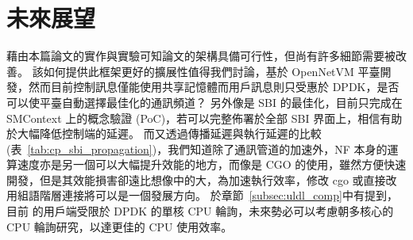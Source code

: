 \chapter{未來展望}
\label{chapter:future}

藉由本篇論文的實作與實驗可知論文的架構具備可行性，但尚有許多細節需要被改善。
該如何提供此框架更好的擴展性值得我們討論，\LHCN 基於 OpenNetVM 平臺開發，然而目前控制訊息僅能使用共享記憶體而用戶訊息則只受惠於 DPDK，是否可以使平臺自動選擇最佳化的通訊頻道？
另外像是 SBI 的最佳化，目前只完成在 SMContext 上的概念驗證 (PoC)，若可以完整佈署於全部 SBI 界面上，相信有助於大幅降低控制端的延遲。
而又透過傳播延遲與執行延遲的比較 (表~\ref{tab:cp_sbi_propagation})，我們知道除了通訊管道的加速外，NF 本身的運算速度亦是另一個可以大幅提升效能的地方，而像是 CGO 的使用，雖然方便快速開發，但是其效能損害卻遠比想像中的大\cite{cgo_not_go}，為加速執行效率，修改 cgo 或直接改用組語階層連接將可以是一個發展方向。
於章節~\ref{subsec:uldl_comp}中有提到，目前 \LHCN 的用戶端受限於 DPDK 的單核 CPU 輪詢，未來勢必可以考慮朝多核心的 CPU 輪詢研究，以達更佳的 CPU 使用效率。
